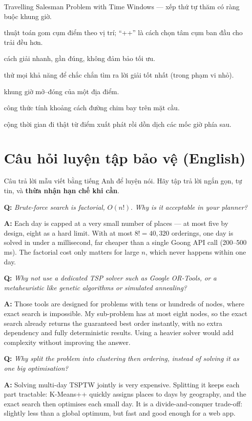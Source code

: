 \documentclass[12pt,a4paper]{article}
\newcommand{\Q}[1]{\medskip\noindent\textbf{Q:} \textit{#1}\par}
\newcommand{\A}{\noindent\textbf{A:} }
\begin{document}
\begin{description}[leftmargin=0pt,style=nextline,itemsep=2pt]
  \item[TSPTW] Travelling Salesman Problem with Time Windows --- xếp thứ tự thăm
  có ràng buộc khung giờ.
  \item[K-Means++] thuật toán gom cụm điểm theo vị trí; ``++'' là cách chọn tâm
  cụm ban đầu cho trải đều hơn.
  \item[Heuristic] cách giải nhanh, gần đúng, không đảm bảo tối ưu.
  \item[Exact / Brute-force] thử mọi khả năng để chắc chắn tìm ra lời giải tốt
  nhất (trong phạm vi nhỏ).
  \item[Time window] khung giờ mở--đóng của một địa điểm.
  \item[Haversine] công thức tính khoảng cách đường chim bay trên mặt cầu.
  \item[GPS cascade] cộng thời gian đi thật từ điểm xuất phát rồi dồn dịch các
  mốc giờ phía sau.
\end{description}

\section{Câu hỏi luyện tập bảo vệ (English)}

Câu trả lời mẫu viết bằng tiếng Anh để luyện nói. Hãy tập trả lời ngắn gọn,
tự tin, và \textbf{thừa nhận hạn chế khi cần}.

\Q{Brute-force search is factorial, $O(n!)$. Why is it acceptable in your planner?}
\A Each day is capped at a very small number of places --- at most five by design,
eight as a hard limit. With at most $8! = 40{,}320$ orderings, one day is solved
in under a millisecond, far cheaper than a single Goong API call (200--500 ms).
The factorial cost only matters for large $n$, which never happens within one day.

\Q{Why not use a dedicated TSP solver such as Google OR-Tools, or a metaheuristic
like genetic algorithms or simulated annealing?}
\A Those tools are designed for problems with tens or hundreds of nodes, where
exact search is impossible. My sub-problem has at most eight nodes, so the exact
search already returns the guaranteed best order instantly, with no extra
dependency and fully deterministic results. Using a heavier solver would add
complexity without improving the answer.

\Q{Why split the problem into clustering then ordering, instead of solving it as
one big optimisation?}
\A Solving multi-day TSPTW jointly is very expensive. Splitting it keeps each
part tractable: K-Means++ quickly assigns places to days by geography, and the
exact search then optimises each small day. It is a divide-and-conquer trade-off:
slightly less than a global optimum, but fast and good enough for a web app.
\end{document}
